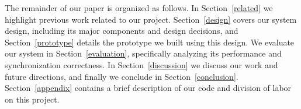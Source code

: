 The remainder of our paper is organized as follows.
In Section~\ref{related} we highlight previous work related to our project.
Section~\ref{design} covers our system design, including
its major components and design decisions,
and Section~\ref{prototype} details the prototype we built using this design.
We evaluate our system in Section~\ref{evaluation}, specifically
analyzing its performance and synchronization correctness.
In Section~\ref{discussion} we discuss our work and future directions,
and finally we conclude in Section~\ref{conclusion}.
Section~\ref{appendix} contains a brief description
of our code and division of labor on this project.
